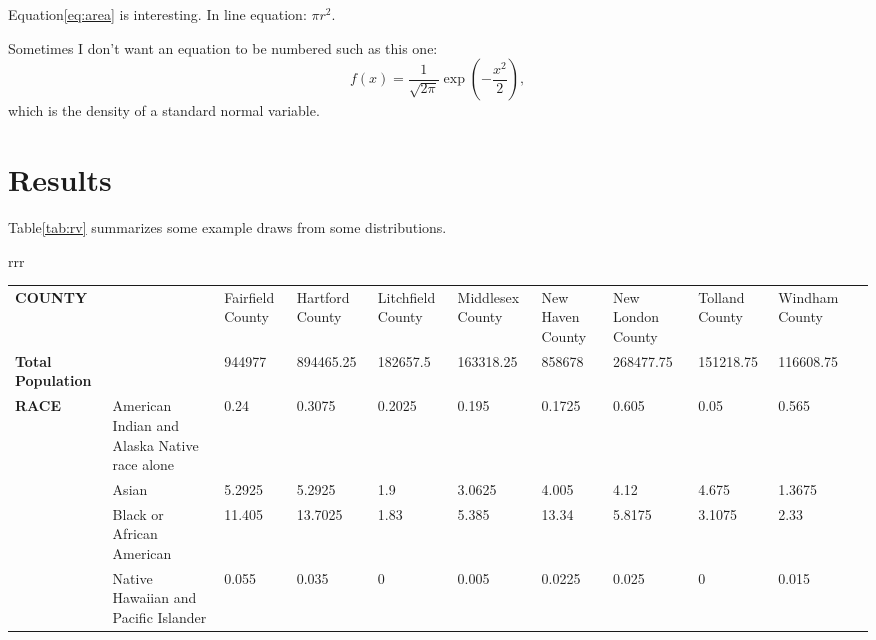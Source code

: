 \documentclass[12pt]{article}
\begin{document}
Equation\ref{eq:area} is interesting. In line equation: $\pi r^2$.\lipsum[1]

Sometimes I don't want an equation to be numbered such as this one:
\[
  f(x) = \frac{1}{\sqrt{2\pi}} \exp\left( - \frac{x^2}{2} \right),
\]
which is the density of a standard normal variable.



\section{Results}\label{sec:resu}


Table\ref{tab:rv} summarizes some example draws from some distributions.
\lipsum[1]

\begin{table}[tbp]
  \caption{This is my first table.}\label{tab:rv}
\centering
\begin{tabular}{rrr}
  \toprule
  \begin{table}[]
    \begin{tabular}{lllllllllll}
    \textbf{COUNTY}                                         &                                              & Fairfield County & Hartford County & Litchfield County & Middlesex County & New Haven County & New London County & Tolland County & Windham County &  \\
    \textbf{Total Population}                               &                                              & 944977           & 894465.25       & 182657.5          & 163318.25        & 858678           & 268477.75         & 151218.75      & 116608.75      &  \\
    \textbf{RACE}                                           & American Indian and Alaska Native race alone & 0.24             & 0.3075          & 0.2025            & 0.195            & 0.1725           & 0.605             & 0.05           & 0.565          &  \\
                                                            & Asian                                        & 5.2925           & 5.2925          & 1.9               & 3.0625           & 4.005            & 4.12              & 4.675          & 1.3675         &  \\
                                                            & Black or African American                    & 11.405           & 13.7025         & 1.83              & 5.385            & 13.34            & 5.8175            & 3.1075         & 2.33           &  \\
                                                            & Native Hawaiian and Pacific Islander         & 0.055            & 0.035           & 0                 & 0.005            & 0.0225           & 0.025             & 0              & 0.015          &  \\

\end{tabular}
\end{table}
\end{tabular}
\end{table}
\end{document}
